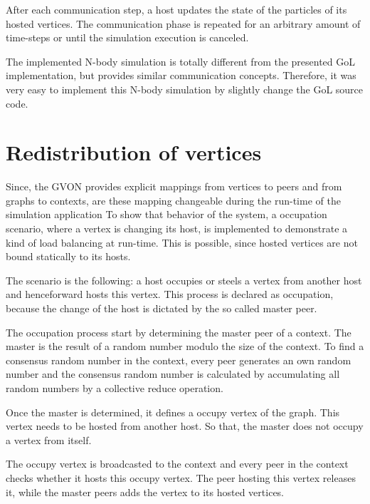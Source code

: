 After each communication step, a host updates the state of the
particles of its hosted vertices.  The communication phase is repeated
for an arbitrary amount of time-steps or until the simulation
execution is canceled.

The implemented N-body simulation is totally different from the
presented GoL implementation, but provides similar communication
concepts. Therefore, it was very easy to implement this N-body
simulation by slightly change the GoL source code.


\section{Redistribution of vertices}

Since, the GVON provides explicit mappings from vertices to peers
and from graphs to contexts, are these mapping changeable during
the run-time of the simulation application
To show that behavior of the system, a occupation scenario, where a
vertex is changing its host, is implemented to demonstrate a kind of load
balancing at run-time. This is possible, since hosted vertices are not
bound statically to its hosts.

The scenario is the following: a host occupies or steels a vertex
from another host and henceforward hosts this vertex.  This process
is declared as occupation, because the change of the host is
dictated by the so called master peer.

The occupation process start by determining the master peer of a
context. The master is the result of a random number modulo the size
of the context. To find a consensus random number in the context,
every peer generates an own random number and the consensus random
number is calculated by accumulating all random numbers by a
collective reduce operation.

Once the master is determined, it defines a occupy vertex of the
graph. This vertex needs to be hosted from another host. So that,
the master does not occupy a vertex from itself.

The occupy vertex is broadcasted to the context and every peer in
the context checks whether it hosts this occupy vertex. The peer
hosting this vertex releases it, while the master peers adds the vertex
to its hosted vertices.

